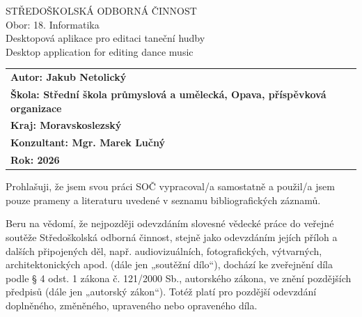 \documentclass[12pt, a4paper,
]{report}
\title{\nazevPrace}
\author{\jmenoAutora}
\date{\datumOdevzdani}
\newcommand\nazevPrace{Desktopová aplikace pro editaci taneční hudby}
\let\cleardoublepage\clearpage
\begin{document}
\pagestyle{empty}
\cleardoublepage



{\bfseries
\begin{center}
  \vspace{0.025 \textheight}
  \LARGE{STŘEDOŠKOLSKÁ ODBORNÁ ČINNOST}\\
  \vspace{0.005 \textheight}
  \large{Obor: 18. Informatika}\\
  \vspace{0.175 \textheight}
  \LARGE {\nazevPrace}\\[1.5em]
  \LARGE {Desktop application for editing dance music}\\[1.5em]
\end{center}


\vspace{0.30 \textheight}

\begin{table}[h!]
\begin{tabular}{ll}
\textbf{Autor: Jakub Netolický}\\
\textbf{Škola: Střední škola průmyslová a umělecká, Opava, příspěvková organizace}\\
\textbf{Kraj: Moravskoslezský}\\
\textbf{Konzultant: Mgr. Marek Lučný}\\
\textbf{Rok: 2026} 
\end{tabular}
\end{table}
}

\cleardoublepage



Prohlašuji, že jsem svou práci SOČ vypracoval/a samostatně a použil/a jsem pouze prameny a literaturu uvedené v seznamu bibliografických záznamů.

Beru na vědomí, že nejpozději odevzdáním slovesné vědecké práce do veřejné soutěže Středoškolská odborná činnost, stejně jako odevzdáním jejích příloh a dalších připojených děl, např. audiovizuálních, fotografických, výtvarných, architektonických apod. (dále jen „soutěžní dílo“), dochází ke zveřejnění díla podle § 4 odst. 1 zákona č. 121/2000 Sb., autorského zákona, ve znění pozdějších předpisů (dále jen „autorský zákon“). Totéž platí pro pozdější odevzdání doplněného, změněného, upraveného nebo opraveného díla.
\end{document}
